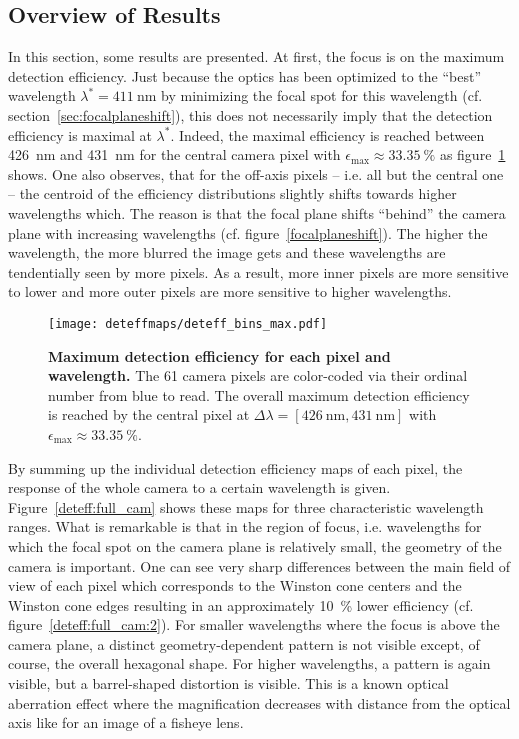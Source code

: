 \subsection{Overview of Results}

In this section, some results are presented. At first, the focus is on the maximum detection efficiency. Just because the optics has been optimized to the \enquote{best} wavelength $\lambda^\ast=\SI{411}{\nano\meter}$ by minimizing the focal spot for this wavelength (cf. section~\ref{sec:focalplaneshift}), this does not necessarily imply that the detection efficiency is maximal at $\lambda^\ast$. Indeed, the maximal efficiency is reached between \SI{426}{\nano\meter} and \SI{431}{\nano\meter} for the central camera pixel with $\epsilon_\text{max}\approx\SI{33.35}{\percent}$ as figure~\ref{max_deteff} shows. One also observes, that for the off-axis pixels -- i.e. all but the central one -- the centroid of the efficiency distributions slightly shifts towards higher wavelengths which. The reason is that the focal plane shifts \enquote{behind} the camera plane with increasing wavelengths (cf. figure~\ref{focalplaneshift}). The higher the wavelength, the more blurred the image gets and these wavelengths are tendentially seen by more pixels. As a result, more inner pixels are more sensitive to lower and more outer pixels are more sensitive to higher wavelengths.\\

\begin{figure}[H]
	\centering
	\texttt{[image: deteffmaps/deteff\_bins\_max.pdf]}
	\caption[Maximum detection efficiency for each pixel and wavelength]{\textbf{Maximum detection efficiency for each pixel and wavelength.} The 61 camera pixels are color-coded via their ordinal number from blue to read. The overall maximum detection efficiency is reached by the central pixel at $\Delta\lambda=[\SI{426}{\nano\meter},\SI{431}{\nano\meter}]$ with $\epsilon_\text{max}\approx\SI{33.35}{\percent}$.}
	\label{max_deteff}
\end{figure}

By summing up the individual detection efficiency maps of each pixel, the response of the whole camera to a certain wavelength is given. Figure~\ref{deteff:full_cam} shows these maps for three characteristic wavelength ranges. What is remarkable is that in the region of focus, i.e. wavelengths for which the focal spot on the camera plane is relatively small, the geometry of the camera is important. One can see very sharp differences between the main field of view of each pixel which corresponds to the Winston cone centers and the Winston cone edges resulting in an approximately \SI{10}{\percent} lower efficiency (cf. figure~\ref{deteff:full_cam:2}). For smaller wavelengths where the focus is above the camera plane, a distinct geometry-dependent pattern is not visible except, of course, the overall hexagonal shape. For higher wavelengths, a pattern is again visible, but a barrel-shaped distortion is visible. This is a known optical aberration effect where the magnification decreases with distance from the optical axis like for an image of a fisheye lens.\\

